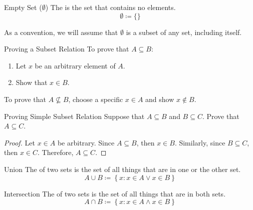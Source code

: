 \documentclass[12pt]{report}
\begin{document}
\begin{dfnbox}{Empty Set ($\emptyset$)}{}
    The  is the set that contains no elements.
    \tcblower
    \[ \emptyset \coloneq \{ \} \]
\end{dfnbox}

As a convention, we will assume that $\emptyset$ is a subset of any set, including itself.


\begin{tecbox}{Proving a Subset Relation}{}
    To prove that $A \subseteq B$:
    \begin{enumerate}
        \item Let $x$ be an arbitrary element of $A$.
        \item Show that $x \in B$.
    \end{enumerate}
    \tcblower
    To prove that $A \not\subseteq B$, choose a specific $x \in A$ and show $x \notin B$.
\end{tecbox}

\begin{exbox}{Proving Simple Subset Relation}{}
    Suppose that $A \subseteq B$ and $B \subseteq C$. Prove that $A \subseteq C$.
    \tcblower
    \begin{proof}
        Let $x \in A$ be arbitrary. Since $A \subseteq B$, then $x \in B$. Similarly, since $B \subseteq C$, then $x \in C$. Therefore, $A \subseteq C$.
    \end{proof}
\end{exbox}

\begin{dfnbox}{Union}{}
    The  of two sets is the set of all things that are in one or the other set.
    \tcblower
    \[ A \cup B \coloneq \left\{ x : x \in A \lor x \in B \right\} \]
\end{dfnbox}

\begin{dfnbox}{Intersection}{}
    The  of two sets is the set of all things that are in both sets.
    \tcblower
    \[ A \cap B \coloneq \left\{ x : x \in A \land x \in B \right\} \]
\end{dfnbox}
\end{document}

